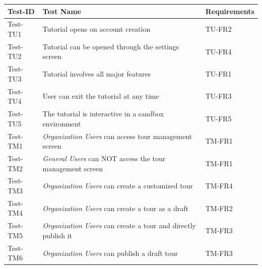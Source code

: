 \documentclass[12pt, titlepage]{article}
\begin{document}
\begin{table}[htpb!]
  \centering
  \begin{tabular}{|l|p{8cm}|p{3cm}|}
    \hline
    \textbf{Test-ID} & \textbf{Test Name}                                                                                                    & \textbf{Requirements} \\
    \hline
    Test-TU1         & Tutorial opens on account creation                                                                                    & TU-FR2                \\
    \hline
    Test-TU2         & Tutorial can be opened through the settings screen                                                                    & TU-FR4                \\
    \hline
    Test-TU3         & Tutorial involves all major features                                                                                  & TU-FR1                \\
    \hline
    Test-TU4         & User can exit the tutorial at any time                                                                                & TU-FR3                \\
    \hline
    Test-TU5         & The tutorial is interactive in a sandbox environment                                                                  & TU-FR5                \\
    \hline
    Test-TM1         & \textit{Organization Users} can access tour management screen                                                         & TM-FR1                \\
    \hline
    Test-TM2         & \textit{General Users} can NOT access the tour management screen                                                      & TM-FR1                \\
    \hline
    Test-TM3         & \textit{Organization Users} can create a customized tour                                                              & TM-FR4                \\
    \hline
    Test-TM4         & \textit{Organization Users} can create a tour as a draft                                                              & TM-FR2                \\
    \hline
    Test-TM5         & \textit{Organization Users} can create a tour and directly publish it                                                 & TM-FR3                \\
    \hline
    Test-TM6         & \textit{Organization Users} can publish a draft tour                                                                  & TM-FR3                \\

\end{tabular}
\end{table}
\end{document}
